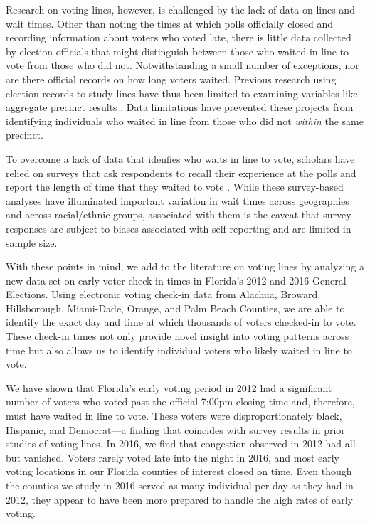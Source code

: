 \documentclass[12pt,titlepage]{article}
\begin{document}
Research on voting lines, however, is challenged by the lack of data
on lines and wait times.  Other than noting the times at which polls
officially closed and recording information about voters who voted
late, there is little data collected by election officials that might
distinguish between those who waited in line to vote from those who
did not.  Notwithstanding a small number of exceptions, nor are there
official records on how long voters waited.  Previous research using
election records to study lines have thus been limited to examining
variables like aggregate precinct results
\citep[e.g.,][]{herronsmith:closingtimes,
  pettigrew:longlinesminorityprecincts}.  Data limitations have
prevented these projects from identifying individuals who waited in
line from those who did not \emph{within} the same precinct.

To overcome a lack of data that idenfies who waits in line to vote,
scholars have relied on surveys that ask respondents to recall their
experience at the polls and report the length of time that they waited
to vote \citep{stewart:waitingtovote2012, pettigrew:racegapwaittimes}.
While these survey-based analyses have illuminated important variation
in wait times across geographies and across racial/ethnic groups,
associated with them is the caveat that survey responses are subject
to biases associated with self-reporting and are limited in sample
size.

With these points in mind, we add to the literature on voting lines by
analyzing a new data set on early voter check-in times in Florida's
2012 and 2016 General Elections. Using electronic voting check-in data
from Alachua, Broward, Hillsborough, Miami-Dade, Orange, and Palm
Beach Counties, we are able to identify the exact day and time at
which thousands of voters checked-in to vote.  These check-in times
not only provide novel insight into voting patterns across time but
also allows us to identify individual voters who likely waited in line
to vote.

We have shown that Florida's early voting period in 2012 had a
significant number of voters who voted past the official 7:00pm
closing time and, therefore, must have waited in line to vote.  These
voters were disproportionately black, Hispanic, and Democrat---a
finding that coincides with survey results in prior studies of voting
lines.  In 2016, we find that congestion observed in 2012 had all but
vanished.  Voters rarely voted late into the night in 2016, and most
early voting locations in our Florida counties of interest closed on
time.  Even though the counties we study in 2016 served as many
individual per day as they had in 2012, they appear to have been more
prepared to handle the high rates of early voting.
  
\end{document}
